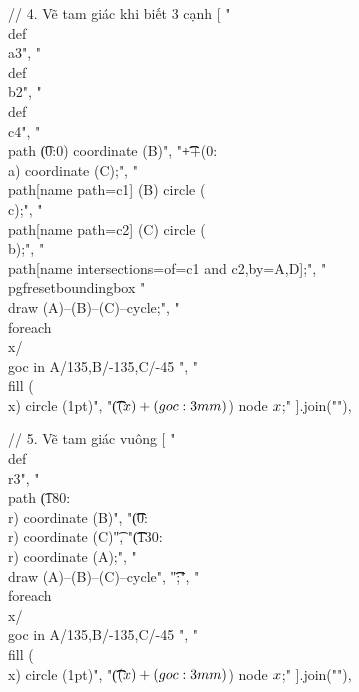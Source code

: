 // 4. Vẽ tam giác khi biết 3 cạnh
[
"\t\\def\\a{3}",
"\t\\def\\b{2}",
"\t\\def\\c{4}",
"\t\\path \t(0:0) coordinate (B)",
"\t\t\t++(0:\\a) coordinate (C);",
"\t\\path[name path=c1]  (B) circle (\\c);",
"\t\\path[name path=c2]  (C) circle (\\b);",
"\t\\path[name intersections={of=c1 and c2,by={A,D}}];",
"\t\\pgfresetboundingbox %
"\t\\draw (A)--(B)--(C)--cycle;",
"\t\\foreach \\x/ \\goc in {A/135,B/-135,C/-45} ",
"\t\t\t\\fill (\\x) circle (1pt)",
"\t\t\t($(\\x)+(\\goc:3mm)$) node {$\\x$};"
].join("\n"),

// 5. Vẽ tam giác vuông
[
"\t\\def\\r{3}",
"\t\\path \t(180:\\r) coordinate (B)",
"\t\t\t(0:\\r) coordinate (C)\t",
"\t\t\t(130:\\r) coordinate (A);",
"\t\\draw (A)--(B)--(C)--cycle",
"\t\t{};",
"\t\\foreach \\x/ \\goc in {A/135,B/-135,C/-45} ",
"\t\t\t\\fill (\\x) circle (1pt)",
"\t\t\t($(\\x)+(\\goc:3mm)$) node {$\\x$};"
].join("\n"),

